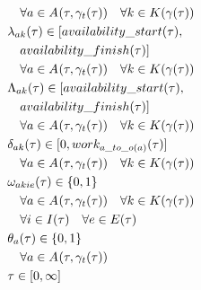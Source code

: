 \begin{alignat}{2}
	& \quad \forall a \in A_{}(\tau, \gamma_{t}(\tau)) \quad \forall k \in K(\gamma_{}(\tau))                                          \\
	& \lambda_{ak}(\tau) \in [availability\_start(\tau), \notag\\
	& \quad availability\_finish(\tau)] \notag\\
	& \quad \forall a \in A_{}(\tau, \gamma_{t}(\tau)) \quad \forall k \in K(\gamma_{}(\tau))  \\
	& \Lambda_{ak}(\tau) \in [availability\_start(\tau), \notag\\
	& \quad availability\_finish(\tau)] \notag\\
	& \quad \forall a \in A_{}(\tau, \gamma_{t}(\tau)) \quad \forall k \in K(\gamma_{}(\tau)) \\
	& \delta_{ak}(\tau) \in [0, work_{a\_to\_o(a)}(\tau) ] \notag\\
	& \quad \forall a \in A_{}(\tau, \gamma_{t}(\tau)) \quad \forall k \in K(\gamma_{}(\tau))                                               \\
	& \omega_{aki e}(\tau) \in \{0 , 1\} \notag\\                                                                                                                                
	& \quad \forall a \in A_{}(\tau, \gamma_{t}(\tau)) \quad \forall k \in K(\gamma_{}(\tau)) \notag\\
	& \quad \forall i \in I(\tau) \quad \forall e \in E(\tau) \\
	& \theta_{a}(\tau) \in \{0, 1\} \notag\\
	& \quad \forall a \in A_{}(\tau, \gamma_{t}(\tau))\\
	& \tau \in [0, \infty] 
\end{alignat}
